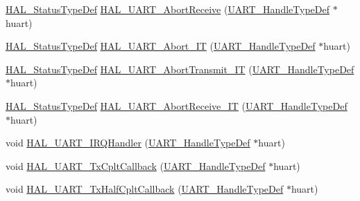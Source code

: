 \begin{DoxyCompactItemize}
\item 
\hyperlink{stm32f4xx__hal__def_8h_a63c0679d1cb8b8c684fbb0632743478f}{H\+A\+L\+\_\+\+Status\+Type\+Def} \hyperlink{group___u_a_r_t___exported___functions___group2_ga9732372cfae60c019bb41554ab12edd6}{H\+A\+L\+\_\+\+U\+A\+R\+T\+\_\+\+Abort\+Receive} (\hyperlink{group___u_a_r_t___exported___types_ga7adf4f3e4c3ecde572be5925c915a967}{U\+A\+R\+T\+\_\+\+Handle\+Type\+Def} $\ast$huart)
\item 
\hyperlink{stm32f4xx__hal__def_8h_a63c0679d1cb8b8c684fbb0632743478f}{H\+A\+L\+\_\+\+Status\+Type\+Def} \hyperlink{group___u_a_r_t___exported___functions___group2_ga3183626ee21f103cbcb50241eca50e4d}{H\+A\+L\+\_\+\+U\+A\+R\+T\+\_\+\+Abort\+\_\+\+IT} (\hyperlink{group___u_a_r_t___exported___types_ga7adf4f3e4c3ecde572be5925c915a967}{U\+A\+R\+T\+\_\+\+Handle\+Type\+Def} $\ast$huart)
\item 
\hyperlink{stm32f4xx__hal__def_8h_a63c0679d1cb8b8c684fbb0632743478f}{H\+A\+L\+\_\+\+Status\+Type\+Def} \hyperlink{group___u_a_r_t___exported___functions___group2_ga0fba12f56413e2dbe8b96040ecf5aa7e}{H\+A\+L\+\_\+\+U\+A\+R\+T\+\_\+\+Abort\+Transmit\+\_\+\+IT} (\hyperlink{group___u_a_r_t___exported___types_ga7adf4f3e4c3ecde572be5925c915a967}{U\+A\+R\+T\+\_\+\+Handle\+Type\+Def} $\ast$huart)
\item 
\hyperlink{stm32f4xx__hal__def_8h_a63c0679d1cb8b8c684fbb0632743478f}{H\+A\+L\+\_\+\+Status\+Type\+Def} \hyperlink{group___u_a_r_t___exported___functions___group2_gaad7bc5748b849abc29d18b2ddd02876f}{H\+A\+L\+\_\+\+U\+A\+R\+T\+\_\+\+Abort\+Receive\+\_\+\+IT} (\hyperlink{group___u_a_r_t___exported___types_ga7adf4f3e4c3ecde572be5925c915a967}{U\+A\+R\+T\+\_\+\+Handle\+Type\+Def} $\ast$huart)
\item 
void \hyperlink{group___u_a_r_t___exported___functions___group2_gaad01472c507ceee3c5f2274c775ff3bf}{H\+A\+L\+\_\+\+U\+A\+R\+T\+\_\+\+I\+R\+Q\+Handler} (\hyperlink{group___u_a_r_t___exported___types_ga7adf4f3e4c3ecde572be5925c915a967}{U\+A\+R\+T\+\_\+\+Handle\+Type\+Def} $\ast$huart)
\item 
void \hyperlink{group___u_a_r_t___exported___functions___group2_gabcdf9b59049eccbc87d54042f9235b1a}{H\+A\+L\+\_\+\+U\+A\+R\+T\+\_\+\+Tx\+Cplt\+Callback} (\hyperlink{group___u_a_r_t___exported___types_ga7adf4f3e4c3ecde572be5925c915a967}{U\+A\+R\+T\+\_\+\+Handle\+Type\+Def} $\ast$huart)
\item 
void \hyperlink{group___u_a_r_t___exported___functions___group2_ga49b287e7de94cd0a38d333629298f7c4}{H\+A\+L\+\_\+\+U\+A\+R\+T\+\_\+\+Tx\+Half\+Cplt\+Callback} (\hyperlink{group___u_a_r_t___exported___types_ga7adf4f3e4c3ecde572be5925c915a967}{U\+A\+R\+T\+\_\+\+Handle\+Type\+Def} $\ast$huart)

\end{DoxyCompactItemize}
